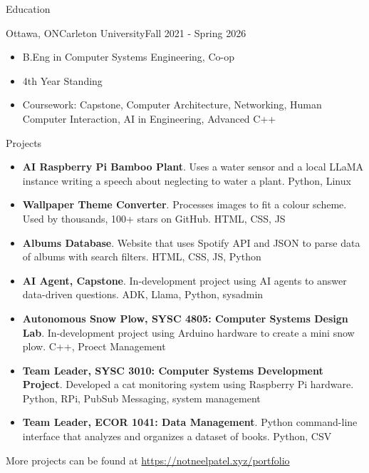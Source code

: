 \documentclass[]{mcdowellcv}
\begin{document}
	\begin{cvsection}{Education}
		\begin{cvsubsection}{Ottawa, ON}{Carleton University}{Fall 2021 - Spring 2026}
			\begin{itemize}
				\item B.Eng in Computer Systems Engineering, Co-op
				\item 4th Year Standing
				\item Coursework: Capstone, Computer Architecture, Networking, Human Computer Interaction, AI in Engineering, Advanced C++ 
			\end{itemize}
		\end{cvsubsection}
	\end{cvsection}
	
	\begin{cvsection}{Projects}
		\begin{cvsubsection}{}{}{}
			\begin{itemize}
				\item \textbf{AI Raspberry Pi Bamboo Plant}. Uses a water sensor and a local LLaMA instance writing a speech about neglecting to water a plant. Python, Linux
				\item \textbf{Wallpaper Theme Converter}. Processes images to fit a colour scheme. Used by thousands, 100+ stars on GitHub. HTML, CSS, JS
				\item \textbf{Albums Database}. Website that uses Spotify API and JSON to parse data of albums with search filters. HTML, CSS, JS, Python
                \item \textbf{AI Agent, Capstone}. In-development project using AI agents to answer data-driven questions. ADK, Llama, Python, sysadmin
				\item \textbf{Autonomous Snow Plow, SYSC 4805: Computer Systems Design Lab}. In-development project using Arduino hardware to create a mini snow plow. C++, Proect Management
				\item \textbf{Team Leader, SYSC 3010: Computer Systems Development Project}. Developed a cat monitoring system using Raspberry Pi hardware. Python, RPi, PubSub Messaging, system management
				\item \textbf{Team Leader, ECOR 1041: Data Management}. Python command-line interface that analyzes and organizes a dataset of books. Python, CSV
			\end{itemize}
				More projects can be found at \url{https://notneelpatel.xyz/portfolio}
		\end{cvsubsection}
	\end{cvsection}
	
\end{document}
